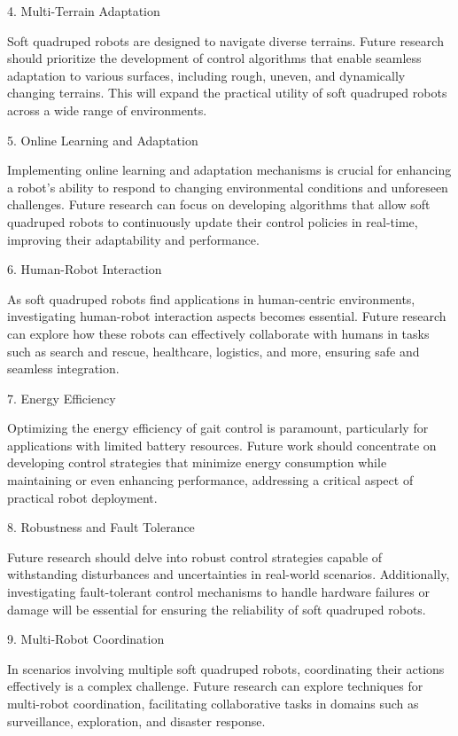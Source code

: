 4. Multi-Terrain Adaptation

Soft quadruped robots are designed to navigate diverse terrains. Future research should prioritize the development of control algorithms that enable seamless adaptation to various surfaces, including rough, uneven, and dynamically changing terrains. This will expand the practical utility of soft quadruped robots across a wide range of environments.

5. Online Learning and Adaptation

Implementing online learning and adaptation mechanisms is crucial for enhancing a robot's ability to respond to changing environmental conditions and unforeseen challenges. Future research can focus on developing algorithms that allow soft quadruped robots to continuously update their control policies in real-time, improving their adaptability and performance.

6. Human-Robot Interaction

As soft quadruped robots find applications in human-centric environments, investigating human-robot interaction aspects becomes essential. Future research can explore how these robots can effectively collaborate with humans in tasks such as search and rescue, healthcare, logistics, and more, ensuring safe and seamless integration.

7. Energy Efficiency

Optimizing the energy efficiency of gait control is paramount, particularly for applications with limited battery resources. Future work should concentrate on developing control strategies that minimize energy consumption while maintaining or even enhancing performance, addressing a critical aspect of practical robot deployment.

8. Robustness and Fault Tolerance

Future research should delve into robust control strategies capable of withstanding disturbances and uncertainties in real-world scenarios. Additionally, investigating fault-tolerant control mechanisms to handle hardware failures or damage will be essential for ensuring the reliability of soft quadruped robots.

9. Multi-Robot Coordination

In scenarios involving multiple soft quadruped robots, coordinating their actions effectively is a complex challenge. Future research can explore techniques for multi-robot coordination, facilitating collaborative tasks in domains such as surveillance, exploration, and disaster response.


